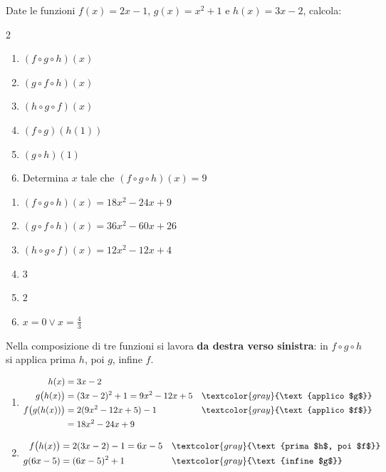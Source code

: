 \begin{question}[ID=1.5, subtitle={Composizione di tre funzioni}, difficulty=difficile, tags={funzioni, composizione}]
Date le funzioni $f(x)=2x-1$, $g(x)=x^2+1$ e $h(x)=3x-2$, calcola:
\begin{multicols}{2}
\begin{enumerate}[leftmargin=3.2cm]
    \item $(f\circ g\circ h)(x)$
    \item $(g\circ f\circ h)(x)$
    \item $(h\circ g\circ f)(x)$
    \item $(f\circ g)(h(1))$
    \item $(g\circ h)(1)$
    \item Determina $x$ tale che $(f\circ g\circ h)(x)=9$
\end{enumerate}
\end{multicols}
\begin{solution}
\begin{enumerate}
    \item $(f\circ g\circ h)(x)=18x^2-24x+9$
    \item $(g\circ f\circ h)(x)=36x^2-60x+26$
    \item $(h\circ g\circ f)(x)=12x^2-12x+4$
    \item $3$
    \item $2$
    \item $x=0\vee x=\tfrac43$
\end{enumerate}
\end{solution}
\begin{explanation}
Nella composizione di tre funzioni si lavora \textbf{da destra verso sinistra}: in $f\circ g\circ h$ si applica prima $h$, poi $g$, infine $f$.
\begin{enumerate}
    \item \[\begin{aligned}
    h(x) &= 3x-2\\
    g\big(h(x)\big) &= (3x-2)^2+1=9x^2-12x+5 && \textcolor{gray}{\text{applico $g$}}\\
    f\big(g(h(x))\big) &= 2(9x^2-12x+5)-1 && \textcolor{gray}{\text{applico $f$}}\\
    &= 18x^2-24x+9
    \end{aligned}\]
    \item \[\begin{aligned}
    f\big(h(x)\big) &= 2(3x-2)-1=6x-5 && \textcolor{gray}{\text{prima $h$, poi $f$}}\\
    g(6x-5) &= (6x-5)^2+1 && \textcolor{gray}{\text{infine $g$}}\\

\end{aligned}\]
\end{enumerate}
\end{explanation}
\end{question}
